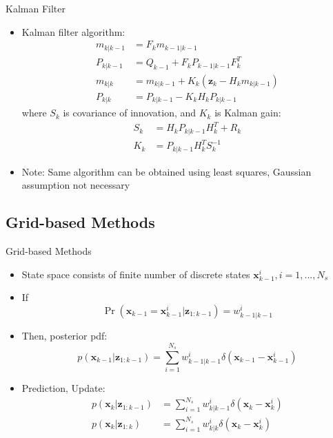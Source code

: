 \documentclass{beamer}
\newcommand{\x}{\mathbf{x}}
\newcommand{\z}{\mathbf{z}}
\begin{document}
\begin{frame}{Kalman Filter}%
  \begin{itemize}
  \item { Kalman filter algorithm:
    \begin{align*}
        m_{k|k-1} &= F_km_{k-1|k-1} \\
        P_{k|k-1} &= Q_{k-1} + F_kP_{k-1|k-1}F_k^T \\
        m_{k|k}   &= m_{k|k-1} + K_k(\mathbf{z}_k - H_km_{k|k-1}) \\
        P_{k|k}   &= P_{k|k-1} - K_kH_kP_{k|k-1}
    \end{align*}
where  $S_k$ is covariance of innovation, and $K_k$ is Kalman gain:
  \begin{align*}
      S_k &= H_kP_{k|k-1}H_k^T + R_k \\
      K_k &= P_{k|k-1}H_k^TS_k^{-1}
  \end{align*}
  }
  \item Note: Same algorithm can be obtained using least squares, Gaussian assumption not necessary 
  \end{itemize}
\end{frame}


\subsection{Grid-based Methods}
\begin{frame}{Grid-based Methods}%
  \begin{itemize}
  	\item { State space consists of finite number of discrete states $	\x_{k-1}^{i}, i=1,..., N_s$
  	}
	\item{If  
    $$
        \Pr(\mathbf{x}_{k-1}=\mathbf{x}_{k-1}^i|\mathbf{z}_{1:k-1})=w_{k-1|k-1}^i
    $$
  	}
  	\item{Then, posterior pdf:         
    $$
        p(\mathbf{x}_{k-1}|\mathbf{z}_{1:k-1}) = 	\sum_{i=1}^{N_s} 
        w_{k-1|k-1}^{i} \delta(\mathbf{x}_{k-1} - \mathbf{x}_{k-1}^i)
    $$
  	}
  	\item{Prediction, Update:  
    	\begin{align*}
        p(\x_k|\z_{1:k-1}) &= \sum_{i=1}^{N_s}w_{k|k-1}^{i}\delta(\x_k - \x_k^i) \\
        p(\x_k|\z_{1:k})   &= \sum_{i=1}^{N_s}w_{k|k}^{i}\delta(\x_k - \x_k^i)        
    	\end{align*}  
  	}
  \end{itemize}
\end{frame}
\end{document}

